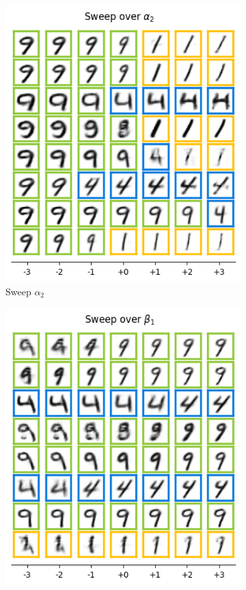 \begin{figure}[h]
\begin{subfigure}[t]{.23\linewidth}
        \includegraphics[width=.9\textwidth]{../openreview/pictures/Figure13/alpha_2.png}
        \caption{Sweep $\alpha_2$}
    \end{subfigure}
    \begin{subfigure}[t]{.23\linewidth}
        \includegraphics[width=.9\textwidth]{../openreview/pictures/Figure13/beta_1.png}

\end{subfigure}
\end{figure}
